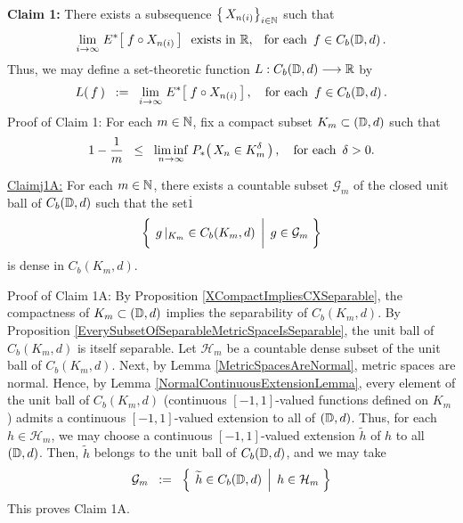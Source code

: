 \vskip 0.8cm
\noindent
\textbf{Claim 1:}\;\;
There exists a subsequence $\left\{\,X_{n(i)}\right\}_{i\in\mathbb{N}}$ such that
\begin{equation*}
\underset{i\rightarrow\infty}{\lim}\; E^{*}\!\left[\; f \circ X_{n(i)} \,\right]
\;\;\textnormal{exists in $\mathbb{R}$, \; for each \,$f \in C_{b}(\mathbb{D},d)$}\,.
\end{equation*}
Thus, we may define a set-theoretic function $L : C_{b}(\mathbb{D},d) \longrightarrow \mathbb{R}$ by
\begin{equation*}
L(\,f\,)
\;\; := \;\;
	\underset{i\rightarrow\infty}{\lim}\; E^{*}\!\left[\; f \circ X_{n(i)} \,\right],
\quad
\textnormal{for each \,$f \in C_{b}(\mathbb{D},d)$}\,.
\end{equation*}
Proof of Claim 1:\;\;
For each $m \in \mathbb{N}$, fix a compact subset $K_{m} \subset (\mathbb{D},d)$ such that
\begin{equation*}
1 - \dfrac{1}{m}
\;\; \leq \;\;
	\underset{n\rightarrow\infty}{\liminf}\;
	P_{*}\!\left(\,X_{n} \in K_{m}^{\delta}\,\right),
\quad
\textnormal{for each \,$\delta > 0$}.
\end{equation*}

\vskip 0.8cm
\begin{center}\begin{minipage}{6.5in}
\underline{Claim{{\color{white}j}}1A:}\;\;
For each $m \in \mathbb{N}$, there exists a countable subset $\mathcal{G}_{m}$
of the closed unit ball of $C_{b}(\mathbb{D},d)$ such that the set{\color{white}$\overset{.}{1}$}
\begin{equation*}
\left\{\;
	\left.
	g\,\vert_{K_{m}} \overset{{\color{white}1}}{\in} C_{b}(K_{m},d)
	\,\;\right\vert\;
	g \in \mathcal{G}_{m}
\;\right\}
\end{equation*}
is dense in $C_{b}(K_{m},d)$.
\end{minipage}\end{center}
Proof of Claim 1A:\;\;
By Proposition \ref{XCompactImpliesCXSeparable}, the compactness of
$K_{m} \subset (\mathbb{D},d)$ implies the separability of $C_{b}(K_{m},d)$.
By Proposition \ref{EverySubsetOfSeparableMetricSpaceIsSeparable},
the unit ball of $C_{b}(K_{m},d)$ is itself separable.
Let $\mathcal{H}_{m}$ be a countable dense subset of the unit ball of $C_{b}(K_{m},d)$.
Next, by Lemma \ref{MetricSpacesAreNormal}, metric spaces are normal.
Hence, by Lemma \ref{NormalContinuousExtensionLemma},
every element of the unit ball of $C_{b}(K_{m},d)$
(continuous $[-1,1]$-valued functions defined on $K_{m}$) 
admits a continuous $[-1,1]$-valued extension to all of $(\mathbb{D},d)$.
Thus, for each $h \in \mathcal{H}_{m}$, we may choose a continuous
$[-1,1]$-valued extension $\widetilde{h}$ of $h$ to all $(\mathbb{D},d)$.
Then, $\widetilde{h}$ belongs to the unit ball of $C_{b}(\mathbb{D},d)$, and we may take
\begin{equation*}
\mathcal{G}_{m}
\;\; := \;\;
	\left\{\;
	\left.
	\widetilde{h} \overset{{\color{white}.}}{\in} C_{b}(\D,d)
	\,\;\right\vert\;
	h \in \mathcal{H}_{m}
	\;\right\}
\end{equation*}
This proves Claim 1A.


